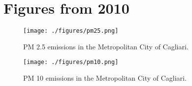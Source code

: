 \documentclass[a4paper]{article}
\begin{document}
\section{Figures from 2010}

\begin{figure}[tbp]
    \centering
    \texttt{[image: ./figures/pm25.png]}
    \caption{PM 2.5 emissions in the Metropolitan City of Cagliari.}
    \label{fig:pm25-prov-casteddu}
\end{figure}

\begin{figure}[tbp]
    \centering
    \texttt{[image: ./figures/pm10.png]}
    \caption{PM 10 emissions in the Metropolitan City of Cagliari.}
    \label{fig:pm10-prov-casteddu}
\end{figure}

\printbibliography
\end{document}
